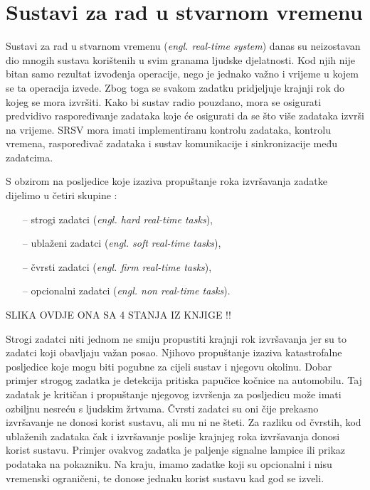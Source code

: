 \documentclass[../zavrsni.tex]{subfiles}
\begin{document}
\sloppy

\justifying

\section{Sustavi za rad u stvarnom vremenu}

Sustavi za rad u stvarnom vremenu (\textit{engl. real-time system}) danas su neizostavan dio mnogih sustava korištenih u svim
granama ljudske djelatnosti. Kod njih nije bitan samo rezultat izvođenja operacije, nego je jednako važno 
i vrijeme u kojem se ta operacija izvede. Zbog toga se svakom zadatku pridjeljuje krajnji rok do kojeg se mora izvršiti. 
Kako bi sustav radio pouzdano, mora se osigurati predvidivo raspoređivanje zadataka koje će osigurati da se što više 
zadataka izvrši na vrijeme.
SRSV mora imati implementiranu kontrolu zadataka, kontrolu vremena, raspoređivač zadataka i sustav komunikacije i sinkronizacije
među zadatcima.

S obzirom na posljedice koje izaziva propuštanje roka izvršavanja zadatke dijelimo u četiri skupine :
\begin{itemize}
    \item[--] strogi zadatci (\textit{engl. hard real-time tasks}),
    \item[--] ublaženi zadatci (\textit{engl. soft real-time tasks}),
    \item[--] čvrsti zadatci (\textit{engl. firm real-time tasks}),
    \item[--] opcionalni zadatci (\textit{engl. non real-time tasks}).
\end{itemize}

SLIKA OVDJE ONA SA 4 STANJA IZ KNJIGE !!

Strogi zadatci niti jednom ne smiju propustiti krajnji rok izvršavanja jer su to zadatci koji obavljaju važan posao. Njihovo 
propuštanje izaziva katastrofalne posljedice koje mogu biti pogubne za cijeli sustav i njegovu okolinu. Dobar primjer strogog zadatka je detekcija 
pritiska papučice kočnice na automobilu. Taj zadatak je kritičan i propuštanje njegovog izvršenja za posljedicu može imati ozbiljnu
nesreću s ljudskim žrtvama. Čvrsti zadatci su oni čije prekasno izvršavanje ne donosi korist sustavu, ali mu ni ne šteti.
Za razliku od čvrstih, kod ublaženih zadataka čak i izvršavanje poslije krajnjeg roka izvršavanja donosi korist sustavu.
Primjer ovakvog zadatka je paljenje signalne lampice ili prikaz podataka na pokazniku.
Na kraju, imamo zadatke koji su opcionalni i nisu vremenski ograničeni, te donose jednaku korist sustavu kad god se izveli.
\end{document}
